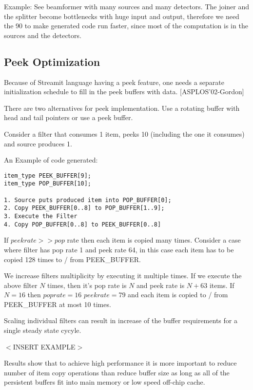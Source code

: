 \documentclass{sig-alternate}
\begin{document}
Example: See beamformer with many sources and many detectors.
The joiner and the splitter become bottlenecks with huge
input and output, therefore we need the 90%
to make generated code run faster, since most of
the computation is in the sources and the detectors. 

\subsection{Peek Optimization}

Because of Streamit language having a peek feature, one needs
a separate initialization schedule to fill in the peek
buffers with data. [ASPLOS'02-Gordon]

There are two alternatives for peek implementation. Use a rotating
buffer with head and tail pointers or use a peek buffer.

Consider a filter that consumes 1 item, peeks 10 (including
the one it consumes) and source produces 1.

An Example of code generated:

\begin{verbatim}
item_type PEEK_BUFFER[9];
item_type POP_BUFFER[10];

1. Source puts produced item into POP_BUFFER[0];
2. Copy PEEK_BUFFER[0..8] to POP_BUFFER[1..9];
3. Execute the Filter
4. Copy POP_BUFFER[0..8] to PEEK_BUFFER[0..8]

\end{verbatim}

If $peek rate >> pop$ rate then each item is copied many times.
Consider a case where filter has pop rate 1 and peek rate 64,
in this case each item has to be copied 128 times to / from PEEK\_BUFFER.

We increase filters multiplicity by executing it multiple times.
If we execute the above filter $N$ times, then it's pop rate is $N$ 
and peek rate is $N+63$ items. If $N=16$ then $poprate=16$ $peekrate=79$
and each item is copied to / from PEEK\_BUFFER at most 10 times.

Scaling individual filters can result in increase of the buffer 
requirements for a single steady state cycyle. 

$<$INSERT EXAMPLE$>$

Results show
that to achieve high performance it is more important to 
reduce number of item copy operations than reduce buffer size
as long as all of the persistent buffers fit into main memory 
or low speed off-chip cache.
\end{document}
